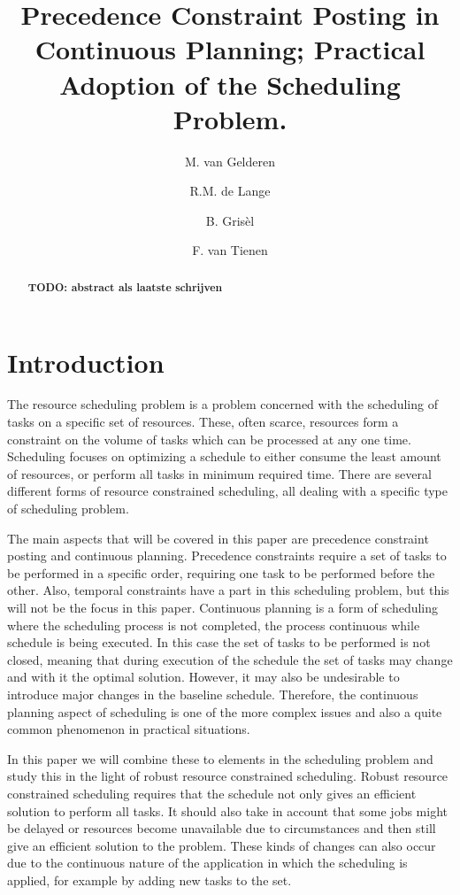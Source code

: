 \documentclass{article}
\title{Precedence Constraint Posting in Continuous Planning; Practical Adoption of the Scheduling Problem.}
\author{M. van Gelderen  \and
    R.M. de Lange \and
    B. Gris\`el \and
    F. van Tienen}
\newcommand{\TODO}[1]{{\color{red}\textbf{TODO: #1}}}
\begin{document}
\maketitle
\thispagestyle{empty}

\begin{abstract}
\TODO{abstract als laatste schrijven}
\end{abstract}


\section{Introduction}

The resource scheduling problem is a problem concerned with the scheduling of tasks on a specific set of resources.
These, often scarce, resources form a constraint on the volume of tasks which can be processed at any one time.
Scheduling focuses on optimizing a schedule to either consume the least amount of resources, or perform all tasks in minimum required time.  \cite{brucker99}
There are several different forms of resource constrained scheduling, all dealing with a specific type of scheduling problem.

The main aspects that will be covered in this paper are precedence constraint posting and continuous planning.
Precedence constraints require a set of tasks to be performed in a specific order, requiring one task to be performed before the other.
Also, temporal constraints have a part in this scheduling problem, but this will not be the focus in this paper.
Continuous planning is a form of scheduling where the scheduling process is not completed, the process continuous while schedule is being executed.
In this case the set of tasks to be performed is not closed, meaning that during execution of the schedule the set of tasks may change and with it the optimal solution.
However, it may also be undesirable to introduce major changes in the baseline schedule.
Therefore, the continuous planning aspect of scheduling is one of the more complex issues and also a quite common phenomenon in practical situations.

In this paper we will combine these to elements in the scheduling problem and study this in the light of robust resource constrained scheduling.
Robust resource constrained scheduling requires that the schedule not only gives an efficient solution to perform all tasks.
It  should also take in account that some jobs might be delayed or resources become unavailable due to circumstances and then still give an efficient solution to the problem.
These kinds of changes can also occur due to the continuous nature of the application in which the scheduling is applied, for example by adding new tasks to the set.
\end{document}
